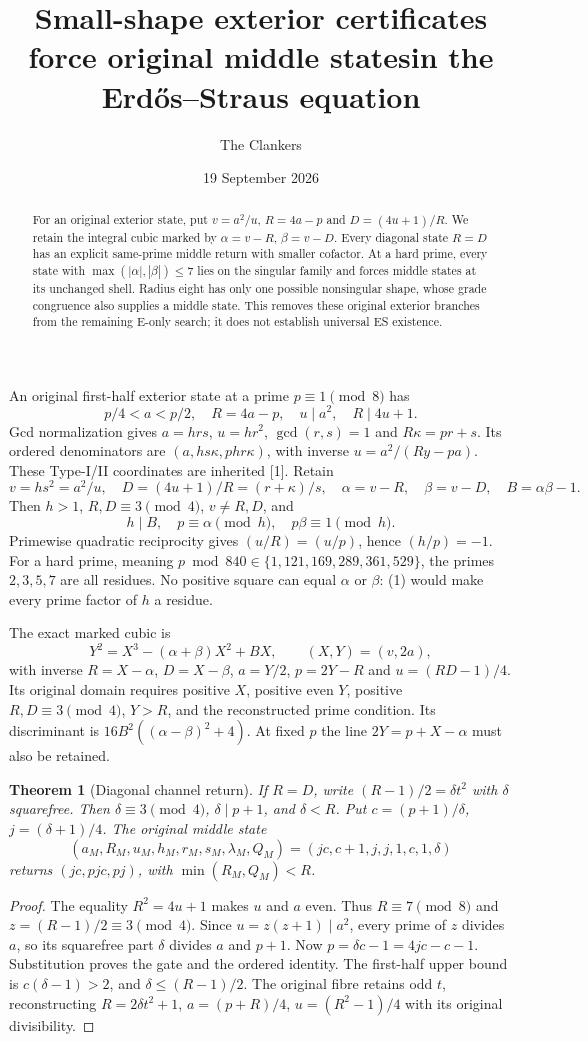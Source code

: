 \documentclass[11pt,reqno]{amsart}
\title{Small-shape exterior certificates force original middle states\newline in the Erd\H{o}s--Straus equation}
\author{The Clankers}\date{19 September 2026}
\newtheorem{theorem}{Theorem}\newtheorem{lemma}[theorem]{Lemma}
\begin{document}
\begin{abstract}
For an original exterior state, put $v=a^2/u$, $R=4a-p$ and $D=(4u+1)/R$.
We retain the integral cubic marked by $\alpha=v-R$, $\beta=v-D$.
Every diagonal state $R=D$ has an explicit same-prime middle return with smaller
cofactor. At a hard prime, every state with $\max(|\alpha|,|\beta|)\le7$ lies on
the singular family and forces middle states at its unchanged shell. Radius eight
has only one possible nonsingular shape, whose grade congruence also supplies a
middle state. This removes these original exterior branches from the remaining
E-only search; it does not establish universal ES existence.
\end{abstract}\maketitle

An original first-half exterior state at a prime $p\equiv1\pmod8$ has
\[
 p/4<a<p/2,\quad R=4a-p,\quad u\mid a^2,\quad R\mid4u+1.
\]
Gcd normalization gives $a=hrs$, $u=hr^2$, $\gcd(r,s)=1$ and
$R\kappa=pr+s$. Its ordered denominators are
$(a,hs\kappa,phr\kappa)$, with inverse $u=a^2/(Ry-pa)$.
These Type-I/II coordinates are inherited [1]. Retain
\[
 v=hs^2=a^2/u,\quad D=(4u+1)/R=(r+\kappa)/s,
 \quad \alpha=v-R,\quad\beta=v-D,\quad B=\alpha\beta-1.
\]
Then $h>1$, $R,D\equiv3\pmod4$, $v\ne R,D$, and
\[
 h\mid B,\quad p\equiv\alpha\pmod h,\quad p\beta\equiv1\pmod h. \tag{1}
\]
Primewise quadratic reciprocity gives $(u/R)=(u/p)$, hence $(h/p)=-1$.
For a hard prime, meaning $p\bmod840\in\{1,121,169,289,361,529\}$, the primes
$2,3,5,7$ are all residues. No positive square can equal $\alpha$ or $\beta$:
(1) would make every prime factor of $h$ a residue.

The exact marked cubic is
\[
 Y^2=X^3-(\alpha+\beta)X^2+BX,\qquad (X,Y)=(v,2a),       \tag{2}
\]
with inverse $R=X-\alpha$, $D=X-\beta$, $a=Y/2$, $p=2Y-R$ and
$u=(RD-1)/4$. Its original domain requires positive $X$, positive even $Y$,
positive $R,D\equiv3\pmod4$, $Y>R$, and the reconstructed prime condition.
Its discriminant is $16B^2((\alpha-\beta)^2+4)$.
At fixed $p$ the line $2Y=p+X-\alpha$ must also be retained.

\begin{theorem}[Diagonal channel return]
If $R=D$, write $(R-1)/2=\delta t^2$ with $\delta$ squarefree. Then
$\delta\equiv3\pmod4$, $\delta\mid p+1$, and $\delta<R$.
Put $c=(p+1)/\delta$, $j=(\delta+1)/4$. The original middle state
\[
 (a_M,R_M,u_M,h_M,r_M,s_M,\lambda_M,Q_M)
 =(jc,c+1,j,j,1,c,1,\delta)
\]
returns $(jc,pjc,pj)$, with $\min(R_M,Q_M)<R$.
\end{theorem}
\begin{proof}
The equality $R^2=4u+1$ makes $u$ and $a$ even. Thus $R\equiv7\pmod8$ and
$z=(R-1)/2\equiv3\pmod4$. Since $u=z(z+1)\mid a^2$, every prime of $z$
divides $a$, so its squarefree part $\delta$ divides $a$ and $p+1$.
Now $p=\delta c-1=4jc-c-1$. Substitution proves the gate and the ordered identity.
The first-half upper bound is $c(\delta-1)>2$, and $\delta\le(R-1)/2$.
The original fibre retains odd $t$, reconstructing
$R=2\delta t^2+1$, $a=(p+R)/4$, $u=(R^2-1)/4$ with its original divisibility.
\end{proof}
\end{document}
